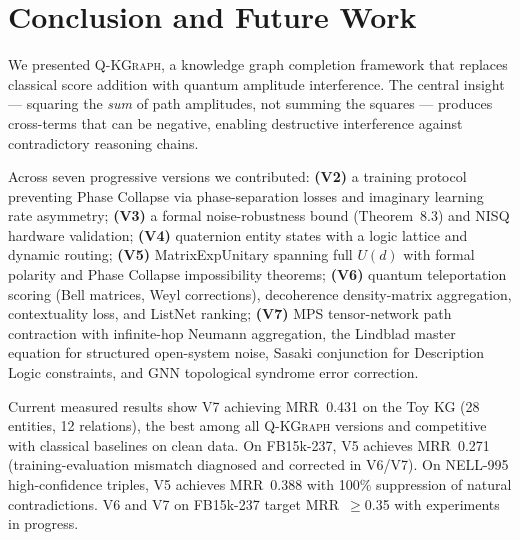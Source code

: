 \documentclass[runningheads]{llncs}
\newcommand{\QR}{\textsc{Q-KGraph}}
\newcommand{\Ud}{U(d)}
\begin{document}
\section{Conclusion and Future Work}
\label{sec:conclusion}

We presented \QR{}, a knowledge graph completion framework that replaces
classical score addition with quantum amplitude interference.  The central
insight --- squaring the \emph{sum} of path amplitudes, not summing the
squares --- produces cross-terms that can be negative, enabling destructive
interference against contradictory reasoning chains.

Across seven progressive versions we contributed:
\textbf{(V2)} a training protocol preventing Phase Collapse via phase-separation
losses and imaginary learning rate asymmetry;
\textbf{(V3)} a formal noise-robustness bound (Theorem~8.3) and NISQ hardware
validation;
\textbf{(V4)} quaternion entity states with a logic lattice and dynamic routing;
\textbf{(V5)} MatrixExpUnitary spanning full $\Ud$ with formal polarity and
Phase Collapse impossibility theorems;
\textbf{(V6)} quantum teleportation scoring (Bell matrices, Weyl corrections),
decoherence density-matrix aggregation, contextuality loss, and ListNet
ranking;
\textbf{(V7)} MPS tensor-network path contraction with infinite-hop Neumann
aggregation, the Lindblad master equation for structured open-system noise,
Sasaki conjunction for Description Logic constraints, and GNN topological
syndrome error correction.

Current measured results show V7 achieving MRR~0.431 on the Toy KG (28
entities, 12 relations), the best among all \QR{} versions and competitive
with classical baselines on clean data.  On FB15k-237, V5 achieves MRR~0.271
(training-evaluation mismatch diagnosed and corrected in V6/V7).  On
NELL-995 high-confidence triples, V5 achieves MRR~0.388 with 100\%
suppression of natural contradictions.  V6 and V7 on FB15k-237 target
MRR~$\geq$0.35 with experiments in progress.
\end{document}
